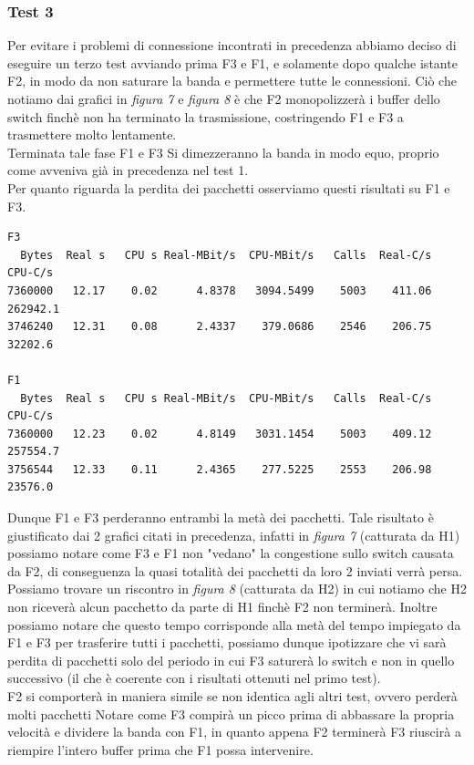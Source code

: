 \documentclass[12pt]{article}
\begin{document}
\subsubsection{Test 3}
Per evitare i problemi di connessione incontrati in precedenza abbiamo deciso di eseguire un terzo test avviando prima F3 e F1, e solamente dopo qualche istante F2, in modo da non saturare la banda e permettere tutte le connessioni. Ciò che notiamo dai grafici in \textit{figura 7} e \textit{figura 8} è che F2 monopolizzerà i buffer dello switch finchè non ha terminato la trasmissione, costringendo F1 e F3 a trasmettere molto lentamente.\\
Terminata tale fase F1 e F3 Si dimezzeranno la banda in modo equo, proprio come avveniva già in precedenza nel test 1.\\
Per quanto riguarda la perdita dei pacchetti osserviamo questi risultati su F1 e F3.
\begin{verbatim}
F3
  Bytes  Real s   CPU s Real-MBit/s  CPU-MBit/s   Calls  Real-C/s   CPU-C/s
7360000   12.17    0.02      4.8378   3094.5499    5003    411.06  262942.1
3746240   12.31    0.08      2.4337    379.0686    2546    206.75   32202.6

F1
  Bytes  Real s   CPU s Real-MBit/s  CPU-MBit/s   Calls  Real-C/s   CPU-C/s
7360000   12.23    0.02      4.8149   3031.1454    5003    409.12  257554.7
3756544   12.33    0.11      2.4365    277.5225    2553    206.98   23576.0
\end{verbatim}
Dunque F1 e F3 perderanno entrambi la metà dei pacchetti. Tale risultato è giustificato dai 2 grafici citati in precedenza, infatti in \textit{figura 7} (catturata da H1) possiamo notare come F3 e F1 non "vedano" la congestione sullo switch causata da F2, di conseguenza la quasi totalità dei pacchetti da loro 2 inviati verrà persa. Possiamo trovare un riscontro in \textit{figura 8} (catturata da H2) in cui notiamo che H2 non riceverà alcun pacchetto da parte di H1 finchè F2 non terminerà. Inoltre possiamo notare che questo tempo corrisponde alla metà del tempo impiegato da F1 e F3 per trasferire tutti i pacchetti, possiamo dunque ipotizzare che vi sarà perdita di pacchetti solo del periodo in cui F3 saturerà lo switch e non in quello successivo (il che è coerente con i risultati ottenuti nel primo test).\\
F2 si comporterà in maniera simile se non identica agli altri test, ovvero perderà molti pacchetti
Notare come F3 compirà un picco prima di abbassare la propria velocità e dividere la banda con F1, in quanto appena F2 terminerà F3 riuscirà a riempire l'intero buffer prima che F1 possa intervenire.
\end{document}
